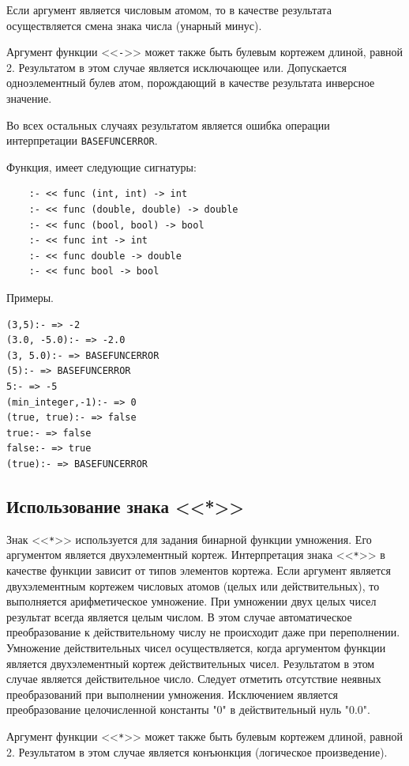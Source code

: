 Если аргумент является числовым атомом, то в качестве результата осуществляется смена знака числа (унарный минус).

Аргумент функции <<\verb|-|>> может также быть булевым кортежем длиной, равной 2. Результатом в этом случае является исключающее или. Допускается одноэлементный булев атом, порождающий в качестве результата инверсное значение.

Во всех остальных случаях результатом является ошибка операции интерпретации \verb|BASEFUNCERROR|.

Функция, имеет следующие сигнатуры:
\begin{verbatim}
    :- << func (int, int) -> int
    :- << func (double, double) -> double
    :- << func (bool, bool) -> bool
    :- << func int -> int
    :- << func double -> double
    :- << func bool -> bool
\end{verbatim}

Примеры.
\begin{verbatim}
(3,5):- => -2
(3.0, -5.0):- => -2.0
(3, 5.0):- => BASEFUNCERROR
(5):- => BASEFUNCERROR
5:- => -5
(min_integer,-1):- => 0
(true, true):- => false
true:- => false
false:- => true
(true):- => BASEFUNCERROR
\end{verbatim}

\subsection{Использование знака <<*>>}

Знак <<\verb|*|>> используется для задания бинарной функции умножения. Его аргументом является двухэлементный кортеж. Интерпретация знака <<\verb|*|>> в качестве функции зависит от типов элементов кортежа. Если аргумент является двухэлементным кортежем числовых атомов (целых или действительных), то выполняется арифметическое умножение. При умножении двух целых чисел результат всегда является целым числом. В этом случае автоматическое преобразование к действительному числу не происходит даже при переполнении. Умножение действительных чисел осуществляется, когда аргументом функции является двухэлементный кортеж действительных чисел. Результатом в этом случае является действительное число. Следует отметить отсутствие неявных преобразований при выполнении умножения. Исключением является преобразование целочисленной константы "0" в действительный нуль "0.0".

Аргумент функции <<\verb|*|>> может также быть булевым кортежем длиной, равной 2. Результатом в этом случае является конъюнкция (логическое произведение).

